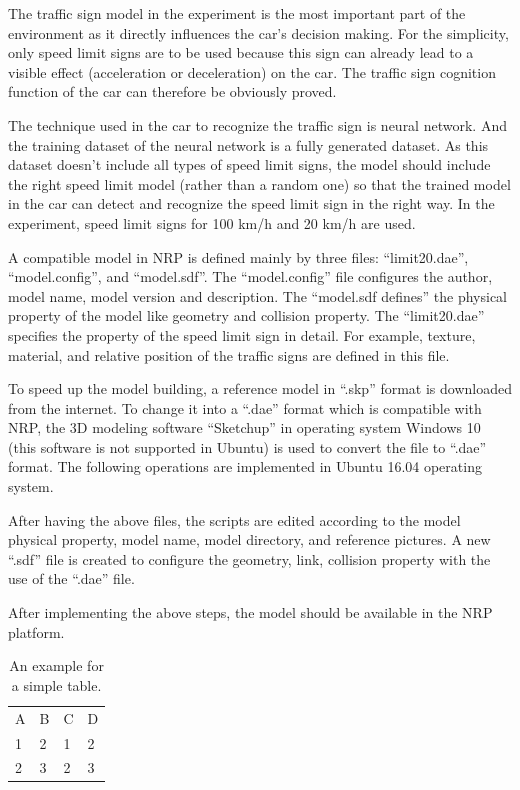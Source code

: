 The traffic sign model in the experiment is the most important part of the environment as it directly influences the car’s decision making. For the simplicity, only speed limit signs are to be used because this sign can already lead to a visible effect (acceleration or deceleration) on the car. The traffic sign cognition function of the car can therefore be obviously proved. 



The technique used in the car to recognize the traffic sign is neural network. And the training dataset of the neural network is a fully generated dataset. As this dataset doesn’t include all types of speed limit signs, the model should include the right speed limit model (rather than a random one) so that the trained model in the car can detect and recognize the speed limit sign in the right way. In the experiment, speed limit signs for 100 km/h and 20 km/h are used.



A compatible model in NRP is defined mainly by three files: ``limit20.dae'', ``model.config'', and ``model.sdf''. The ``model.config'' file configures the author, model name, model version and description. The ``model.sdf defines'' the physical property of the model like geometry and collision property. The ``limit20.dae'' specifies the property of the speed limit sign in detail. For example, texture, material, and relative position of the traffic signs are defined in this file.



To speed up the model building, a reference model in ``.skp'' format is downloaded from the internet. To change it into a ``.dae'' format which is compatible with NRP, the 3D modeling software ``Sketchup'' in operating system Windows 10 (this software is not supported in Ubuntu) is used to convert the file to ``.dae'' format. The following operations are implemented in Ubuntu 16.04 operating system. 



After having the above files, the scripts are edited according to the model physical property, model name, model directory, and reference pictures. A new ``.sdf'' file is created to configure the geometry, link, collision property with the use of the ``.dae'' file. 

After implementing the above steps, the model should be available in the NRP platform.





\begin{table}[htpb]
	\caption[Example table]{An example for a simple table.}\label{tab:sampleA}
	\centering
	\begin{tabular}{l l l l}
		A & B & C & D \\
		\cline{1-4}	
		1 & 2 & 1 & 2 \\
		2 & 3 & 2 & 3 \\
	\end{tabular}
\end{table}



